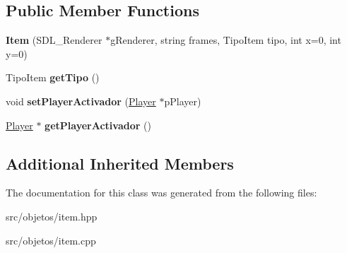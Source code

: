 \subsection*{Public Member Functions}
\begin{DoxyCompactItemize}
\item 
{\bfseries Item} (S\+D\+L\+\_\+\+Renderer $\ast$g\+Renderer, string frames, Tipo\+Item tipo, int x=0, int y=0)\hypertarget{class_item_a2c308c75be1a43da9477b33f9af3e3ed}{}\label{class_item_a2c308c75be1a43da9477b33f9af3e3ed}

\item 
Tipo\+Item {\bfseries get\+Tipo} ()\hypertarget{class_item_a6afd68697e76f50a6cd33993c5fcbf12}{}\label{class_item_a6afd68697e76f50a6cd33993c5fcbf12}

\item 
void {\bfseries set\+Player\+Activador} (\hyperlink{class_player}{Player} $\ast$p\+Player)\hypertarget{class_item_a2147bf53d5ba3a1b01c9f916bb91a976}{}\label{class_item_a2147bf53d5ba3a1b01c9f916bb91a976}

\item 
\hyperlink{class_player}{Player} $\ast$ {\bfseries get\+Player\+Activador} ()\hypertarget{class_item_a2c72815d6996dc65e8b76aec6bdd6f97}{}\label{class_item_a2c72815d6996dc65e8b76aec6bdd6f97}

\end{DoxyCompactItemize}
\subsection*{Additional Inherited Members}


The documentation for this class was generated from the following files\+:\begin{DoxyCompactItemize}
\item 
src/objetos/item.\+hpp\item 
src/objetos/item.\+cpp\end{DoxyCompactItemize}
